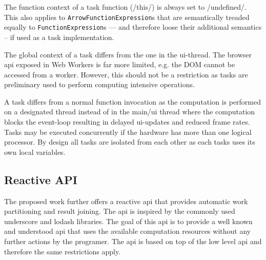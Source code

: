The function context of a task function (\javascriptinline/this/) is always set to \javascriptinline/undefined/. This also applies to \texttt{ArrowFunctionExpression}s that are semantically treaded equally to \texttt{FunctionExpression}s --- and therefore loose their additional semantics -- if used as a task implementation.

The global context of a task differs from the one in the ui-thread. The browser api exposed in Web Workers is far more limited, e.g. the DOM cannot be accessed from a worker. However, this should not be a restriction as tasks are preliminary used to perform computing intensive operations. 

A task differs from a normal function invocation as the computation is performed on a designated thread instead of in the main/ui thread where the computation blocks the event-loop resulting in delayed ui-updates and reduced frame rates. Tasks may be executed concurrently if the hardware has more than one logical processor. By design all tasks are isolated from each other as each tasks uses its own local variables.

\subsection{Reactive API}
The proposed work further offers a reactive api that provides automatic work partitioning and result joining. The api is inspired by the commonly used underscore and lodash libraries. The goal of this api is to provide a well known and understood api that uses the available computation resources without any further actions by the programer. The api is based on top of the low level api and therefore the same restrictions apply. 

